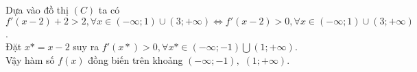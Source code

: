 \begin{ex}
{\begin{center}
\begin{tikzpicture}[scale=0.7,font=\footnotesize, line join=round, line cap=round, >=stealth]
			\end{tikzpicture}
		\end{center}
		Dựa vào đồ thị $(C)$ ta có\\ $f'\left(x-2\right)+2>2,\forall x\in\left(-\infty ;1\right)\cup\left(3;+\infty\right)\Leftrightarrow{f}'\left(x-2\right)>0,\forall x\in\left(-\infty ;1\right)\cup\left(3;+\infty\right)$ .\\
		Đặt $ x*=x-2$ suy ra $f'\left(x*\right)>0,\forall x*\in\left(-\infty ;-1\right)\bigcup\left(1;+\infty\right)$.\\
		Vậy hàm số $ f(x)$ đồng biến trên khoảng $\left(-\infty ;-1\right),\,\,\left(1;+\infty\right)$.}
\end{ex}

